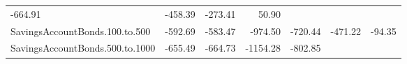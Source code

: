 \documentclass[]{article}
\begin{document}
\begin{longtable}[]{@{}lrrrrrr@{}}
\begin{minipage}[t]{0.08\columnwidth}
-664.91\strut
\end{minipage} & \begin{minipage}[t]{0.08\columnwidth}\raggedleft\strut
-458.39\strut
\end{minipage} & \begin{minipage}[t]{0.08\columnwidth}\raggedleft\strut
-273.41\strut
\end{minipage} & \begin{minipage}[t]{0.08\columnwidth}\raggedleft\strut
50.90\strut
\end{minipage}\tabularnewline
\begin{minipage}[t]{0.31\columnwidth}\raggedright\strut
SavingsAccountBonds.100.to.500\strut
\end{minipage} & \begin{minipage}[t]{0.10\columnwidth}\raggedleft\strut
-592.69\strut
\end{minipage} & \begin{minipage}[t]{0.08\columnwidth}\raggedleft\strut
-583.47\strut
\end{minipage} & \begin{minipage}[t]{0.08\columnwidth}\raggedleft\strut
-974.50\strut
\end{minipage} & \begin{minipage}[t]{0.08\columnwidth}\raggedleft\strut
-720.44\strut
\end{minipage} & \begin{minipage}[t]{0.08\columnwidth}\raggedleft\strut
-471.22\strut
\end{minipage} & \begin{minipage}[t]{0.08\columnwidth}\raggedleft\strut
-94.35\strut
\end{minipage}\tabularnewline
\begin{minipage}[t]{0.31\columnwidth}\raggedright\strut
SavingsAccountBonds.500.to.1000\strut
\end{minipage} & \begin{minipage}[t]{0.10\columnwidth}\raggedleft\strut
-655.49\strut
\end{minipage} & \begin{minipage}[t]{0.08\columnwidth}\raggedleft\strut
-664.73\strut
\end{minipage} & \begin{minipage}[t]{0.08\columnwidth}\raggedleft\strut
-1154.28\strut
\end{minipage} & \begin{minipage}[t]{0.08\columnwidth}\raggedleft\strut
-802.85\strut
\end{minipage} & \begin{minipage}[t]{0.08\columnwidth}\raggedleft\strut

\end{minipage}
\end{longtable}
\end{document}
